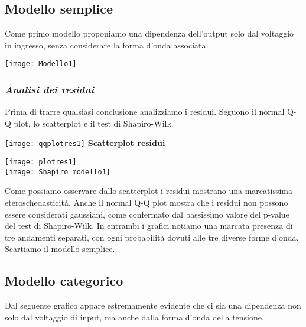\documentclass[a4paper]{article}
\begin{document}
	
	
	
	

\subsection{Modello semplice}
Come primo modello proponiamo una dipendenza dell’output solo dal voltaggio in ingresso, senza considerare la forma d’onda associata.
\begin{center}
	
	\texttt{[image: Modello1]} 
	
\end{center}
\subsubsection*{\textit{Analisi dei residui}}
Prima di trarre qualsiasi conclusione analizziamo i residui. Seguono il normal Q-Q plot, lo scatterplot e il test di Shapiro-Wilk.
\begin{center}
	
	\texttt{[image: qqplotres1]} 
	\newline
	\newline
	\newline
	\newline
	\newline
\footnotesize{\textbf{Scatterplot residui}}

	\texttt{[image: plotres1]}
\bigskip	\\
\medskip
\medskip
	\texttt{[image: Shapiro\_modello1]} 
	 
\end{center}

Come possiamo osservare dallo scatterplot i residui mostrano una marcatissima eteroschedasticità. Anche il  normal Q-Q plot mostra che i residui non possono essere considerati gaussiani, come confermato dal bassissimo valore del p-value del test di Shapiro-Wilk. In entrambi i grafici notiamo una marcata presenza di tre andamenti separati, con ogni probabilità dovuti alle tre diverse forme d’onda. Scartiamo il modello semplice.

	\subsection{Modello categorico}
	
	Dal seguente grafico appare estremamente evidente che ci sia una dipendenza non solo dal voltaggio di input, ma anche dalla forma  d'onda della tensione.
	
\end{document}
